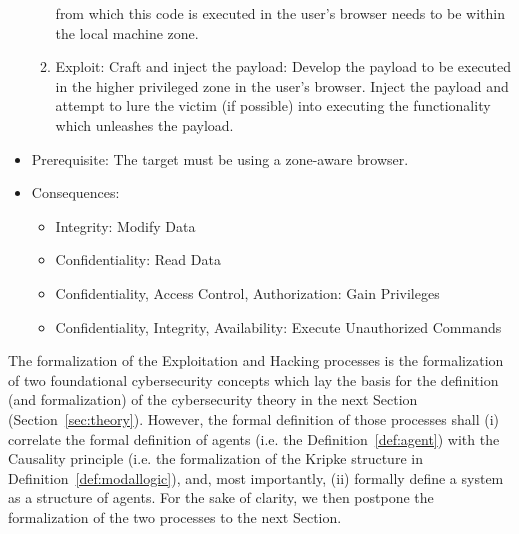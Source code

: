 \begin{example}
\begin{itemize}
\begin{enumerate}
					from which this code is executed in the
					user's browser needs to be within the
					local machine zone.
				\item Exploit: Craft and inject the payload:
					Develop the payload to be executed in
					the higher privileged zone in the
					user's browser. Inject the payload and
					attempt to lure the victim (if
					possible) into executing the
					functionality which unleashes the
					payload.
			\end{enumerate}
		\item Prerequisite: The target must be using a zone-aware browser. 
		\item Consequences: 
			\begin{itemize}
				\item Integrity: Modify Data
				\item Confidentiality: Read Data
				\item Confidentiality, Access Control, Authorization: Gain Privileges
				\item Confidentiality, Integrity, Availability: Execute Unauthorized Commands
			\end{itemize}
	\end{itemize}

\end{example}

The formalization of the Exploitation and Hacking processes is the
formalization of two foundational cybersecurity concepts which lay the basis
for the definition (and formalization) of the cybersecurity theory in the next
Section (Section~\ref{sec:theory}). However, the formal definition of those
processes shall (i) correlate the formal definition of agents (i.e. the
Definition~\ref{def:agent}) with the Causality principle (i.e. the
formalization of the Kripke structure in Definition~\ref{def:modallogic}), and,
most importantly, (ii) formally define a system as a structure of agents. For
the sake of clarity, we then postpone the formalization of the two processes to
the next Section.
